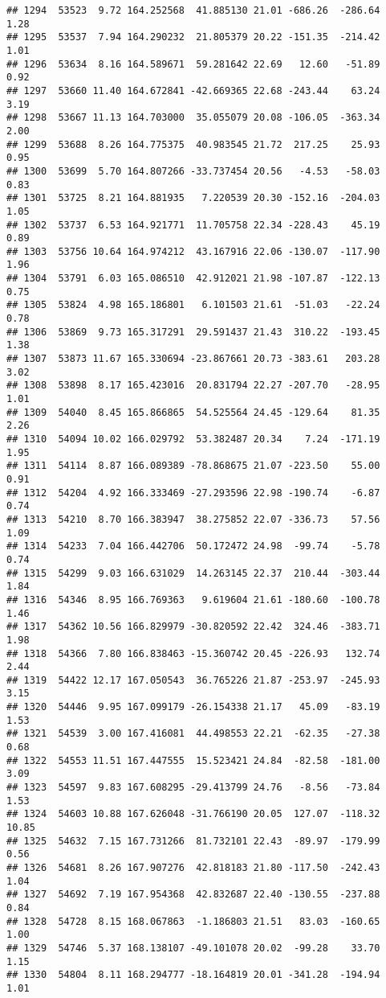 \documentclass[]{article}
\begin{document}
\begin{verbatim}
## 1294  53523  9.72 164.252568  41.885130 21.01 -686.26  -286.64  1.28
## 1295  53537  7.94 164.290232  21.805379 20.22 -151.35  -214.42  1.01
## 1296  53634  8.16 164.589671  59.281642 22.69   12.60   -51.89  0.92
## 1297  53660 11.40 164.672841 -42.669365 22.68 -243.44    63.24  3.19
## 1298  53667 11.13 164.703000  35.055079 20.08 -106.05  -363.34  2.00
## 1299  53688  8.26 164.775375  40.983545 21.72  217.25    25.93  0.95
## 1300  53699  5.70 164.807266 -33.737454 20.56   -4.53   -58.03  0.83
## 1301  53725  8.21 164.881935   7.220539 20.30 -152.16  -204.03  1.05
## 1302  53737  6.53 164.921771  11.705758 22.34 -228.43    45.19  0.89
## 1303  53756 10.64 164.974212  43.167916 22.06 -130.07  -117.90  1.96
## 1304  53791  6.03 165.086510  42.912021 21.98 -107.87  -122.13  0.75
## 1305  53824  4.98 165.186801   6.101503 21.61  -51.03   -22.24  0.78
## 1306  53869  9.73 165.317291  29.591437 21.43  310.22  -193.45  1.38
## 1307  53873 11.67 165.330694 -23.867661 20.73 -383.61   203.28  3.02
## 1308  53898  8.17 165.423016  20.831794 22.27 -207.70   -28.95  1.01
## 1309  54040  8.45 165.866865  54.525564 24.45 -129.64    81.35  2.26
## 1310  54094 10.02 166.029792  53.382487 20.34    7.24  -171.19  1.95
## 1311  54114  8.87 166.089389 -78.868675 21.07 -223.50    55.00  0.91
## 1312  54204  4.92 166.333469 -27.293596 22.98 -190.74    -6.87  0.74
## 1313  54210  8.70 166.383947  38.275852 22.07 -336.73    57.56  1.09
## 1314  54233  7.04 166.442706  50.172472 24.98  -99.74    -5.78  0.74
## 1315  54299  9.03 166.631029  14.263145 22.37  210.44  -303.44  1.84
## 1316  54346  8.95 166.769363   9.619604 21.61 -180.60  -100.78  1.46
## 1317  54362 10.56 166.829979 -30.820592 22.42  324.46  -383.71  1.98
## 1318  54366  7.80 166.838463 -15.360742 20.45 -226.93   132.74  2.44
## 1319  54422 12.17 167.050543  36.765226 21.87 -253.97  -245.93  3.15
## 1320  54446  9.95 167.099179 -26.154338 21.17   45.09   -83.19  1.53
## 1321  54539  3.00 167.416081  44.498553 22.21  -62.35   -27.38  0.68
## 1322  54553 11.51 167.447555  15.523421 24.84  -82.58  -181.00  3.09
## 1323  54597  9.83 167.608295 -29.413799 24.76   -8.56   -73.84  1.53
## 1324  54603 10.88 167.626048 -31.766190 20.05  127.07  -118.32 10.85
## 1325  54632  7.15 167.731266  81.732101 22.43  -89.97  -179.99  0.56
## 1326  54681  8.26 167.907276  42.818183 21.80 -117.50  -242.43  1.04
## 1327  54692  7.19 167.954368  42.832687 22.40 -130.55  -237.88  0.84
## 1328  54728  8.15 168.067863  -1.186803 21.51   83.03  -160.65  1.00
## 1329  54746  5.37 168.138107 -49.101078 20.02  -99.28    33.70  1.15
## 1330  54804  8.11 168.294777 -18.164819 20.01 -341.28  -194.94  1.01

\end{verbatim}
\end{document}
